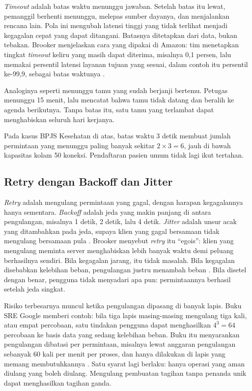 \textit{Timeout} adalah batas waktu menunggu jawaban. Setelah batas itu lewat, pemanggil berhenti
menunggu, melepas sumber dayanya, dan menjalankan rencana lain. Pola ini mengubah latensi tinggi
yang tidak terlihat menjadi kegagalan cepat yang dapat ditangani. Batasnya ditetapkan dari data,
bukan tebakan. Brooker menjelaskan cara yang dipakai di Amazon: tim menetapkan tingkat
\textit{timeout} keliru yang masih dapat diterima, misalnya 0,1 persen, lalu memakai persentil
latensi layanan tujuan yang sesuai, dalam contoh itu persentil ke-99,9, sebagai batas waktunya
\cite{c12-brooker2019}.

Analoginya seperti menunggu tamu yang sudah berjanji bertemu. Petugas menunggu 15 menit, lalu
mencatat bahwa tamu tidak datang dan beralih ke agenda berikutnya. Tanpa batas itu, satu tamu yang
terlambat dapat menghabiskan seluruh hari kerjanya.

Pada kasus BPJS Kesehatan di atas, batas waktu 3 detik membuat jumlah permintaan yang menunggu
paling banyak sekitar $2 \times 3 = 6$, jauh di bawah kapasitas kolam 50 koneksi. Pendaftaran pasien
umum tidak lagi ikut tertahan.

\subsection{Retry dengan Backoff dan Jitter}

\textit{Retry} adalah mengulang permintaan yang gagal, dengan harapan kegagalannya hanya sementara.
\textit{Backoff} adalah jeda yang makin panjang di antara pengulangan, misalnya 1 detik, 2 detik,
lalu 4 detik. \textit{Jitter} adalah unsur acak yang ditambahkan pada jeda, supaya klien yang gagal
bersamaan tidak mengulang bersamaan pula \cite{c12-brooker2019}. Brooker menyebut \textit{retry}
itu ``egois'': klien yang mengulang meminta server menghabiskan lebih banyak waktu demi peluang
berhasilnya sendiri. Bila kegagalan jarang, itu tidak masalah. Bila kegagalan disebabkan kelebihan
beban, pengulangan justru menambah beban \cite{c12-brooker2019}. Bila disetel dengan benar,
pengguna tidak menyadari apa pun: permintaannya berhasil setelah jeda singkat.

Risiko terbesarnya muncul ketika pengulangan dipasang di banyak lapis. Buku SRE Google memberi
contoh: bila tiga lapis masing-masing mengulang tiga kali, atau empat percobaan, satu tindakan
pengguna dapat menghasilkan $4^3 = 64$ percobaan ke basis data yang sedang kelebihan beban. Buku
itu menyarankan pengulangan dibatasi per permintaan, misalnya lewat anggaran pengulangan sebanyak 60
kali per menit per proses, dan hanya dilakukan di lapis yang memang membutuhkannya \cite{beyer2016}.
Satu syarat lagi berlaku: hanya operasi yang aman diulang yang boleh diulang. Mengulang pembuatan
tagihan tanpa penanda unik dapat menghasilkan tagihan ganda.


